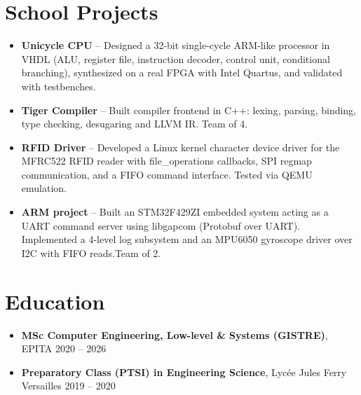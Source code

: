\documentclass[9pt,a4paper]{article}
\begin{document}
\section*{School Projects}
\begin{tcolorbox}[mybox]
\begin{itemize}
\item \textbf{Unicycle CPU} -- Designed a 32-bit single-cycle ARM-like processor in VHDL (ALU, register file, instruction decoder, control unit, conditional branching), synthesized on a real FPGA with Intel Quartus, and validated with testbenches.

\item \textbf{Tiger Compiler} -- Built compiler frontend in C++: lexing, parsing, binding, type checking, desugaring and LLVM IR. Team of 4.

\item \textbf{RFID Driver} -- Developed a Linux kernel character device driver for the MFRC522 RFID reader with file\_operations callbacks, SPI regmap communication, and a FIFO command interface. Tested via QEMU emulation.

\item \textbf{ARM project} -- Built an STM32F429ZI embedded system acting as a UART command server using libgapcom (Protobuf over UART). Implemented a 4-level log subsystem and an MPU6050 gyroscope driver over I2C with FIFO reads.Team of 2.
\end{itemize}
\end{tcolorbox}


\section*{Education}
\begin{tcolorbox}[mybox]
\begin{itemize}
\item \textbf{MSc Computer Engineering, Low-level \& Systems (GISTRE)}, EPITA {\small{\hfill 2020 – 2026}}

\item \textbf{Preparatory Class (PTSI) in Engineering Science}, Lycée Jules Ferry Versailles {\small{\hfill 2019 – 2020}}
\end{itemize}
\end{tcolorbox}
\end{document}
